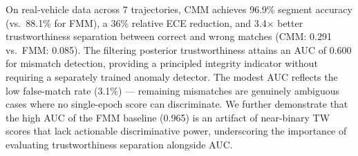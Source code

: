 \documentclass[letterpaper,journal]{IEEEtran}
\begin{document}
On real-vehicle data across 7 trajectories, CMM achieves 96.9\%
segment accuracy (vs.\ 88.1\% for FMM), a 36\% relative ECE reduction,
and 3.4$\times$ better trustworthiness separation between correct and
wrong matches (CMM: 0.291 vs.\ FMM: 0.085). The filtering posterior
trustworthiness attains an AUC of 0.600 for mismatch detection,
providing a principled integrity indicator without requiring a
separately trained anomaly detector. The modest AUC reflects the
low false-match rate (3.1\%) --- remaining mismatches are genuinely
ambiguous cases where no single-epoch score can discriminate.
We further demonstrate that the high AUC of the FMM baseline (0.965)
is an artifact of near-binary TW scores that lack actionable
discriminative power, underscoring the importance of evaluating
trustworthiness separation alongside AUC.
\end{document}
